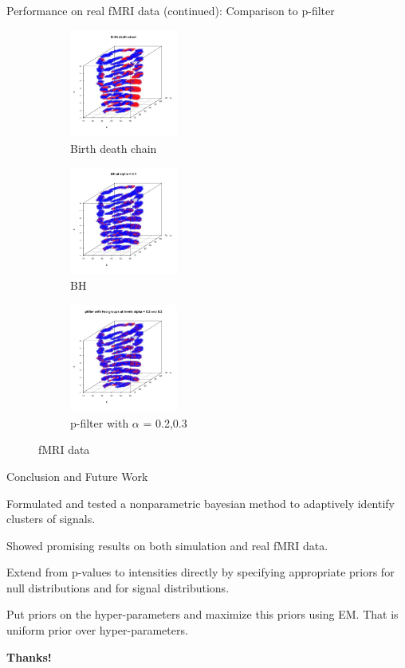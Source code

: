 \documentclass[10pt,mathserif]{beamer}
\begin{document}
\begin{frame}{Performance on real fMRI data (continued): Comparison to p-filter}
\begin{figure}[t!]
    \centering
    \begin{subfigure}[t]{0.3\textwidth}
        \centering
        \includegraphics[height=1.4in]{../BDC_predictions.jpg}
        \caption{Birth death chain}
    \end{subfigure}%
    \begin{subfigure}[t]{0.3\textwidth}
        \centering
        \includegraphics[height=1.4in]{../BH_predictions.jpg}
        \caption{BH}
    \end{subfigure}%
    \begin{subfigure}[t]{0.3\textwidth}
        \centering
        \includegraphics[height=1.4in]{../pfilter_predictions2.jpg}
        \caption{p-filter with $\alpha$ = 0.2,0.3}
    \end{subfigure}
    \caption{fMRI data}
\end{figure}
\end{frame}

\begin{frame}{Conclusion and Future Work}
\BIT
\item Formulated and tested a nonparametric bayesian method to adaptively identify clusters of signals.
\item Showed promising results on both simulation and real fMRI data.
\item Extend from p-values to intensities directly by specifying appropriate priors for null distributions and for signal distributions.
\item Put priors on the hyper-parameters and maximize this priors using EM. That is uniform prior over hyper-parameters.
\EIT
\begin{center}
\textbf{\large Thanks!}
\end{center}
\end{frame}
\end{document}
